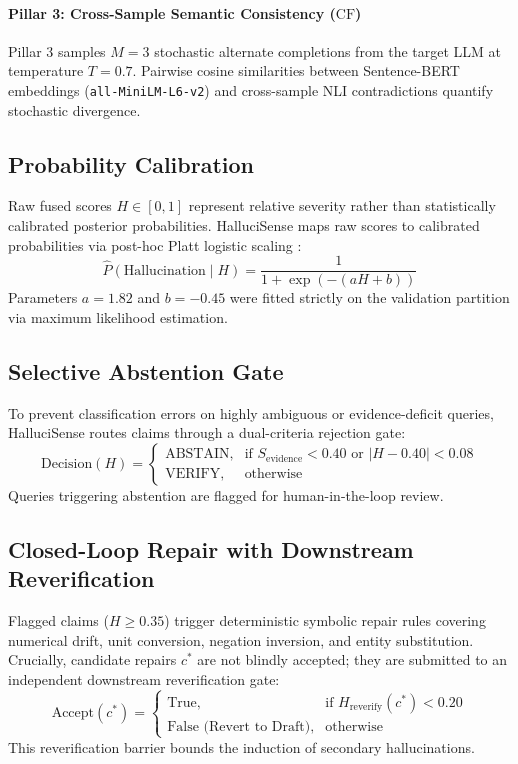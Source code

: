 \documentclass[conference]{IEEEtran}
\begin{document}
\paragraph{Pillar 3: Cross-Sample Semantic Consistency ($\text{CF}$)}
Pillar 3 samples $M=3$ stochastic alternate completions from the target LLM at temperature $T=0.7$. Pairwise cosine similarities between Sentence-BERT embeddings (\texttt{all-MiniLM-L6-v2}) and cross-sample NLI contradictions quantify stochastic divergence.

\subsection{Probability Calibration}
Raw fused scores $H \in [0, 1]$ represent relative severity rather than statistically calibrated posterior probabilities. HalluciSense maps raw scores to calibrated probabilities via post-hoc Platt logistic scaling \cite{platt1999probabilistic}:
\begin{equation}
\hat{P}(\text{Hallucination} \mid H) = \frac{1}{1 + \exp(-(a H + b))}
\label{eq:platt}
\end{equation}
Parameters $a = 1.82$ and $b = -0.45$ were fitted strictly on the validation partition via maximum likelihood estimation.

\subsection{Selective Abstention Gate}
To prevent classification errors on highly ambiguous or evidence-deficit queries, HalluciSense routes claims through a dual-criteria rejection gate:
\begin{equation}
\text{Decision}(H) = 
\begin{cases}
\text{ABSTAIN}, & \text{if } S_{\text{evidence}} < 0.40 \text{ or } |H - 0.40| < 0.08 \\
\text{VERIFY}, & \text{otherwise}
\end{cases}
\end{equation}
Queries triggering abstention are flagged for human-in-the-loop review.

\subsection{Closed-Loop Repair with Downstream Reverification}
Flagged claims ($H \ge 0.35$) trigger deterministic symbolic repair rules covering numerical drift, unit conversion, negation inversion, and entity substitution. Crucially, candidate repairs $c^*$ are not blindly accepted; they are submitted to an independent downstream reverification gate:
\begin{equation}
\text{Accept}(c^*) = 
\begin{cases}
\text{True}, & \text{if } H_{\text{reverify}}(c^*) < 0.20 \\
\text{False (Revert to Draft)}, & \text{otherwise}
\end{cases}
\end{equation}
This reverification barrier bounds the induction of secondary hallucinations.
\end{document}
